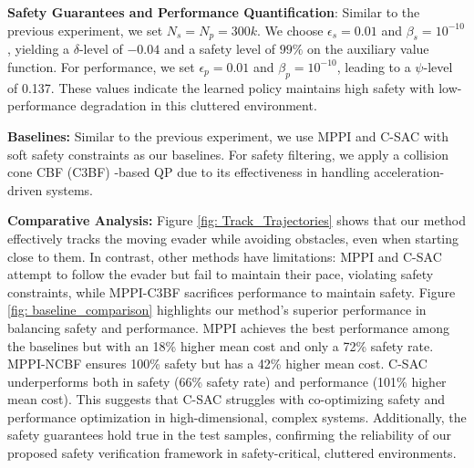 \textbf{Safety Guarantees and Performance Quantification}:
Similar to the previous experiment, we set $N_s = N_p = 300k$. We choose $\epsilon_s = 0.01$ and $\beta_s = 10^{-10}$, yielding a $\delta$-level of $-0.04$ and a safety level of $99\%$ on the auxiliary value function. For performance, we set $\epsilon_p = 0.01$ and $\beta_p = 10^{-10}$, leading to a $\psi$-level of 0.137. These values indicate the learned policy maintains high safety with low-performance degradation in this cluttered environment.

\textbf{Baselines:} Similar to the previous experiment, we use MPPI and C-SAC with soft safety constraints as our baselines. For safety filtering, we apply a collision cone CBF (C3BF) \cite{10644338}-based QP due to its effectiveness in handling acceleration-driven systems.

\textbf{Comparative Analysis:} Figure \ref{fig: Track_Trajectories} shows that our method effectively tracks the moving evader while avoiding obstacles, even when starting close to them. In contrast, other methods have limitations: MPPI and C-SAC attempt to follow the evader but fail to maintain their pace, violating safety constraints, while MPPI-C3BF sacrifices performance to maintain safety. Figure \ref{fig: baseline_comparison} highlights our method's superior performance in balancing safety and performance. MPPI achieves the best performance among the baselines but with an 18\% higher mean cost and only a 72\% safety rate. MPPI-NCBF ensures 100\% safety but has a 42\% higher mean cost. C-SAC underperforms both in safety (66\% safety rate) and performance (101\% higher mean cost). This suggests that C-SAC struggles with co-optimizing safety and performance optimization in high-dimensional, complex systems. Additionally, the safety guarantees hold true in the test samples, confirming the reliability of our proposed safety verification framework in safety-critical, cluttered environments.

